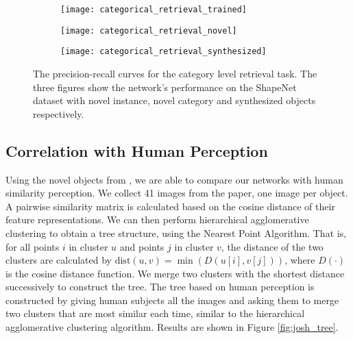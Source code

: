 \documentclass{article} %
\begin{document}

\begin{figure*}
  \centering
  \begin{subfigure}{0.3\linewidth}
  \texttt{[image: categorical\_retrieval\_trained]}
  \end{subfigure}
  \centering
  \begin{subfigure}{0.3\linewidth}
  \texttt{[image: categorical\_retrieval\_novel]}
  \end{subfigure}
  \centering
  \begin{subfigure}{0.3\linewidth}
  \texttt{[image: categorical\_retrieval\_synthesized]}
  \end{subfigure}
  
  \caption{The precision-recall curves for the category level retrieval task. The three figures show the network's performance on the ShapeNet dataset with novel instance, novel category and synthesized objects respectively.}
  \label{fig:category}
\end{figure*}

\subsection{Correlation with Human Perception}
Using the novel objects from \citet{tenenbaum2011grow}, we are able to compare our networks with human similarity perception. We collect 41 images from the paper,  one image per object. A pairwise similarity matrix is calculated based on the cosine distance of their feature representations. We can then perform hierarchical agglomerative clustering to obtain a tree structure, using the Nearest Point Algorithm. That is, for all points $i$ in cluster $u$ and points $j$ in cluster $v$, the distance of the two clusters are calculated by $\mathrm{dist}(u,v)=\min(D(u[i], v[j]))$, where $D(\cdot)$ is the cosine distance function. We merge two clusters with the shortest distance successively to construct the tree. The tree based on human perception is constructed by giving  human subjects all the images and asking them to merge two clusters that are most similar each time, similar to the hierarchical agglomerative clustering algorithm. Results are shown in Figure \ref{fig:josh_tree}.
\end{document}
